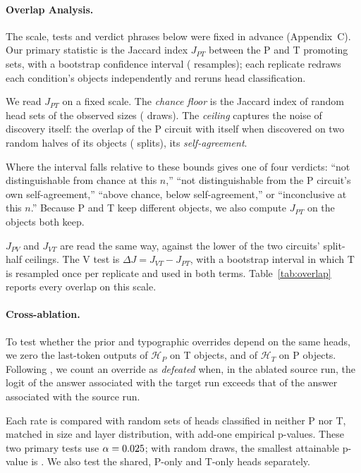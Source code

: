 \documentclass[letterpaper]{article}
\newcommand{\HP}{\mathcal{H}_P}
\newcommand{\HT}{\mathcal{H}_T}
\begin{document}
\paragraph{Overlap Analysis.}
The scale, tests and verdict phrases below were fixed in advance (Appendix~C). Our primary statistic is the Jaccard index $J_{PT}$ between the P and T promoting sets, with a bootstrap confidence interval (\nBoot{} resamples); each replicate redraws each condition's objects independently and reruns head classification. 

We read $J_{PT}$ on a fixed scale. The \emph{chance floor} is the Jaccard index of random head sets of the observed sizes (\nPerm{} draws). The \emph{ceiling} captures the noise of discovery itself: the overlap of the P circuit with itself when discovered on two random halves of its objects (\nHalfSplits{} splits), its \emph{self-agreement}. 

Where the interval falls relative to these bounds gives one of four verdicts: ``not distinguishable from chance at this $n$,'' ``not distinguishable from the P circuit's own self-agreement,'' ``above chance, below self-agreement,'' or ``inconclusive at this $n$.'' Because P and T keep different objects, we also compute $J_{PT}$ on the objects both keep.

$J_{PV}$ and $J_{VT}$ are read the same way, against the lower of the two circuits' split-half ceilings. The V test is $\Delta J = J_{VT} - J_{PT}$, with a bootstrap interval in which T is resampled once per replicate and used in both terms. Table~\ref{tab:overlap} reports every overlap on this scale.


\paragraph{Cross-ablation.}
To test whether the prior and typographic overrides depend on the same heads,
we zero the last-token outputs of $\HP$ on T objects, and of $\HT$ on P
objects.
Following \citet{lietzow2026}, we count an override as
\emph{defeated} when, in the ablated source run, the logit of the
answer associated with the target run exceeds that of the answer
associated with the source run.

Each rate is compared with \hTwoDraws{} random sets of heads classified in neither P nor T,
matched in size and layer distribution, with add-one empirical p-values. These two primary tests use
$\alpha=0.025$; with \hTwoDraws{} random
draws, the smallest attainable p-value is \hTwoMinP.
We also test the shared, P-only and T-only heads separately.
\end{document}
